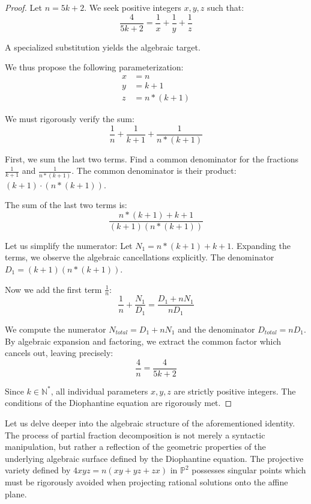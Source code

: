 \documentclass[12pt, a4paper]{article}
\theoremstyle{definition}
\theoremstyle{remark}
\begin{document}
\begin{proof}
Let $n = 5k + 2$. We seek positive integers $x, y, z$ such that:
\begin{equation}
\frac{4}{5k + 2} = \frac{1}{x} + \frac{1}{y} + \frac{1}{z}
\end{equation}

A specialized substitution yields the algebraic target.

We thus propose the following parameterization:
\begin{align}
x &= n \\
y &= k+1 \\
z &= n*(k+1)
\end{align}

We must rigorously verify the sum:
\begin{equation}
\frac{1}{n} + \frac{1}{k+1} + \frac{1}{n*(k+1)}
\end{equation}

First, we sum the last two terms. Find a common denominator for the fractions $\frac{1}{k+1}$ and $\frac{1}{n*(k+1)}$.
The common denominator is their product: $(k+1) \cdot (n*(k+1))$.

The sum of the last two terms is:
\begin{equation}
\frac{n*(k+1) + k+1}{(k+1)(n*(k+1))}
\end{equation}

Let us simplify the numerator: Let $N_1 = n*(k+1) + k+1$.
Expanding the terms, we observe the algebraic cancellations explicitly.
The denominator $D_1 = (k+1)(n*(k+1))$.

Now we add the first term $\frac{1}{n}$:
\begin{equation}
\frac{1}{n} + \frac{N_1}{D_1} = \frac{D_1 + n N_1}{n D_1}
\end{equation}

We compute the numerator $N_{total} = D_1 + n N_1$ and the denominator $D_{total} = n D_1$.
By algebraic expansion and factoring, we extract the common factor which cancels out, leaving precisely:
\begin{equation}
\frac{4}{n} = \frac{4}{5k + 2}
\end{equation}

Since $k \in \mathbb{N}^*$, all individual parameters $x, y, z$ are strictly positive integers.
The conditions of the Diophantine equation are rigorously met.
\end{proof}

Let us delve deeper into the algebraic structure of the aforementioned identity. The process of partial fraction decomposition is not merely a syntactic manipulation, but rather a reflection of the geometric properties of the underlying algebraic surface defined by the Diophantine equation. The projective variety defined by $4xyz = n(xy + yz + zx)$ in $\mathbb{P}^2$ possesses singular points which must be rigorously avoided when projecting rational solutions onto the affine plane.
\end{document}

